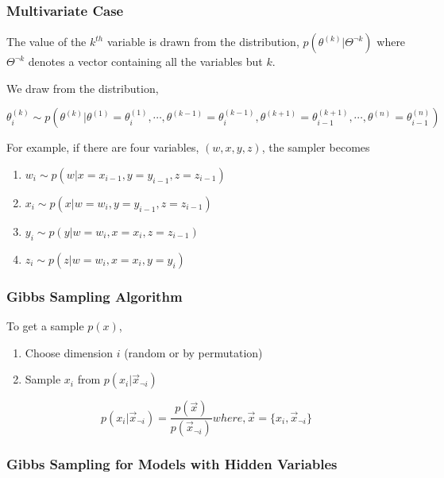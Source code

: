 \subsubsection*{Multivariate Case}

The value of the \(k^{th}\) variable is drawn from the distribution, \(p(\theta^{(k)}|\Theta^{\neg k})\) where \(\Theta^{\neg k}\) denotes
a vector containing all the variables but \(k\). 

We draw from the distribution,

\(\theta_{i}^{(k)} \sim p(\theta^{(k)} | \theta^{(1)}=\theta_{i}^{(1)}, \cdots,\theta^{(k-1)}=\theta_{i}^{(k-1)},\theta^{(k+1)}=\theta_{i-1}^{(k+1)},\cdots,\theta^{(n)}=\theta_{i-1}^{(n)})\)

For example, if there are four variables, \((w,x,y,z)\), the sampler becomes

\begin{enumerate}
 \item \(w_i \sim p(w | x = x_{i-1}, y = y_{i-1}, z = z_{i-1})\)
 \item \(x_i \sim p(x | w = w_{i}, y = y_{i-1}, z = z_{i-1})\)
 \item \(y_i \sim p(y | w = w_{i}, x = x_{i}, z = z_{i-1})\)
 \item \(z_i \sim p(z | w = w_{i}, x = x_{i}, y = y_{i})\)
\end{enumerate}

\subsubsection*{Gibbs Sampling Algorithm}

To get a sample \(p(x)\),

\begin{enumerate}
 \item Choose dimension \(i\) (random or by permutation)
 \item Sample \(x_i\) from \(p(x_i|\vec{x}_{\neg i})\)
\end{enumerate}

\begin{equation}
 p(x_i|\vec{x}_{\neg i}) = \frac{p(\vec{x})}{p(\vec{x}_{\neg i})} where, \vec{x} = \{x_i,\vec{x}_{\neg i}\}
\end{equation}

\subsubsection*{Gibbs Sampling for Models with Hidden Variables}

